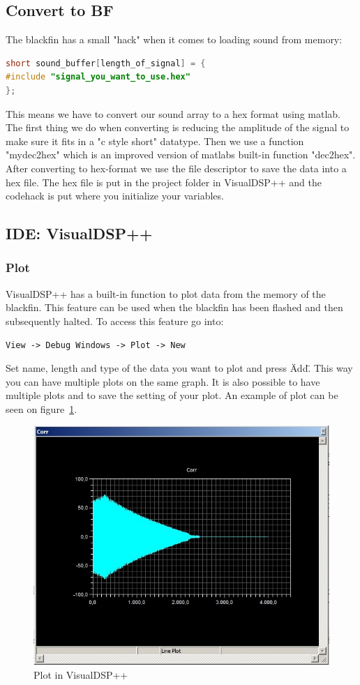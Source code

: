 \subsection{Convert to BF}
The blackfin has a small "hack" when it comes to loading sound from memory:
\begin{lstlisting}[language=C]
short sound_buffer[length_of_signal] = { 
#include "signal_you_want_to_use.hex"
};
\end{lstlisting}
This means we have to convert our sound array to a hex format using matlab. The first thing we do when converting is reducing the amplitude of the signal to make sure it fits in a "c style short" datatype. Then we use a function "mydec2hex" which is an improved version of matlabs built-in function "dec2hex". After converting to hex-format we use the file descriptor to save the data into a hex file. The hex file is put in the project folder in VisualDSP++ and the codehack is put where you initialize your variables.



\subsection{IDE: VisualDSP++}
\subsubsection{Plot}
VisualDSP++ has a built-in function to plot data from the memory of the blackfin. This feature can be used when the blackfin has been flashed and then subsequently halted. To access this feature go into:
\begin{verbatim}
View -> Debug Windows -> Plot -> New
\end{verbatim}
Set name, length and type of the data you want to plot and press \"Add\". This way you can have multiple plots on the same graph. It is also possible to have multiple plots and to save the setting of your plot. An example of plot can be seen on figure~\ref{fig:visualdspplot}.
\begin{figure}[hbpt]
\centering
\includegraphics[scale=0.5]{billeder/visualdspplot}
\caption{Plot in VisualDSP++}
\label{fig:visualdspplot}
\end{figure}
